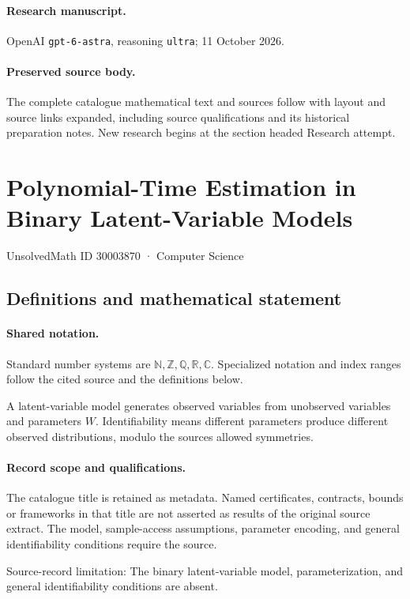 \documentclass[11pt]{article}
\begin{document}
\paragraph{Research manuscript.} OpenAI \texttt{gpt-6-astra}, reasoning \texttt{ultra}; 11 October 2026.
\paragraph{Preserved source body.} The complete catalogue mathematical text and sources follow with layout and source links expanded, including source qualifications and its historical preparation notes. New research begins at the section headed Research attempt.

\section{Polynomial-Time Estimation in Binary Latent-Variable Models}\label{30003870}
{\small UnsolvedMath ID 30003870 · Computer Science}
\subsection{Definitions and mathematical statement}

\paragraph{Shared notation.}Standard number systems are $\mathbb N,\mathbb Z,\mathbb Q,\mathbb R,\mathbb C$. Specialized notation and index ranges follow the cited source and the definitions below.


A latent-variable model generates observed variables from unobserved variables and parameters $W$. Identifiability means different parameters produce different observed distributions, modulo the source\textquotesingle s allowed symmetries.
\paragraph{Record scope and qualifications.}
The catalogue title is retained as metadata. Named certificates, contracts, bounds or frameworks in that title are not asserted as results of the original source extract.
The model, sample-access assumptions, parameter encoding, and general identifiability conditions require the source.

Source-record limitation: The binary latent-variable model, parameterization, and general identifiability conditions are absent.
\end{document}
